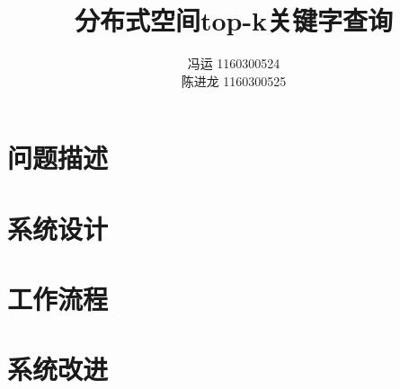 \documentclass{elegantpaper}
\title{分布式空间top-k关键字查询}
\author{
    冯运 1160300524 %
    \\[0.5ex] %
    陈进龙 1160300525 %
}
\begin{document}
\maketitle

\begin{abstract}
\end{abstract}

\section{问题描述}

\section{系统设计}

\section{工作流程}

\section{系统改进}
\end{document}
